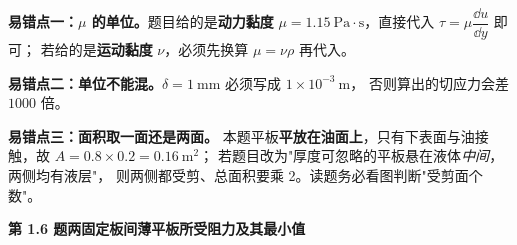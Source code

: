 \begin{yicuo}
\textbf{易错点一：$\mu$ 的单位。}题目给的是\textbf{动力黏度}
$\mu=1.15\ \mathrm{Pa\cdot s}$，直接代入 $\tau=\mu\dfrac{\dd u}{\dd y}$ 即可；
若给的是\textbf{运动黏度} $\nu$，必须先换算 $\mu=\nu\rho$ 再代入。

\textbf{易错点二：单位不能混。}$\delta=1\ \mathrm{mm}$ 必须写成 $1\times10^{-3}\ \mathrm{m}$，
否则算出的切应力会差 $1000$ 倍。

\textbf{易错点三：面积取一面还是两面。}
本题平板\textbf{平放在油面上}，只有下表面与油接触，故 $A=0.8\times0.2=0.16\ \mathrm{m^2}$；
若题目改为"厚度可忽略的平板悬在液体\emph{中间}，两侧均有液层"，
则两侧都受剪、总面积要乘 2。读题务必看图判断"受剪面个数"。
\end{yicuo}

\noindent\textbf{第 1.6 题\quad 两固定板间薄平板所受阻力及其最小值}

